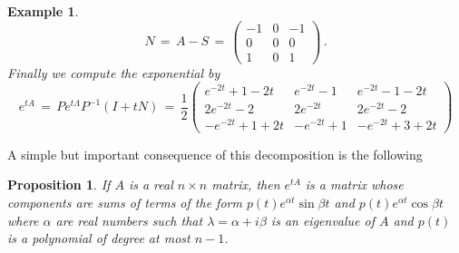 \documentclass[12pt]{report}
\newtheorem{prop}[theorem]{Proposition}
\newtheorem{example}[theorem]{Example}
\begin{document}
\begin{example}
{\begin{equation}
\end{equation}
\begin{equation}
N\,=\, A -S \,=\, \left( \begin{array}{rrr} -1 & 0 & -1 \\ 0 & 0 & 0 \\ 1 & 0 & 1 \end{array} \right)\,.
\end{equation}
Finally we compute the exponential by 
\begin{equation}
e^{tA} \,=\, P e^{t\Lambda} P^{-1} (I + t N)\,=\,  \frac{1}{2}\left( \begin{array}{ccc} e^{-2t} + 1 -2t & e^{-2t}-1 & e^{-2t} -1 -2t \\ 2 e^{-2t}-2 & 2 e^{-2t} & 2 e^{-2t} -2 \\ -e^{-2t} + 1 + 2t & -e^{-2t} + 1 & -e^{-2t} + 3 + 2t \end{array} \right)
\end{equation}
}
\end{example}

 

A simple but important consequence of this decomposition is the following
\begin{prop}\label{solform} 
If $A$ is a real $n\times n$ matrix, then $e^{tA}$ is a matrix whose
components are sums of terms of the form $p(t)e^{\alpha t} \sin \beta
t$ and $p(t)e^{\alpha t} \cos \beta t$ where $\alpha$ are real numbers
such that $\lambda=\alpha +i \beta$ is an eigenvalue of $A$ and
$p(t)$ is a polynomial of degree at most $n-1$.
\end{prop}


\end{document}

